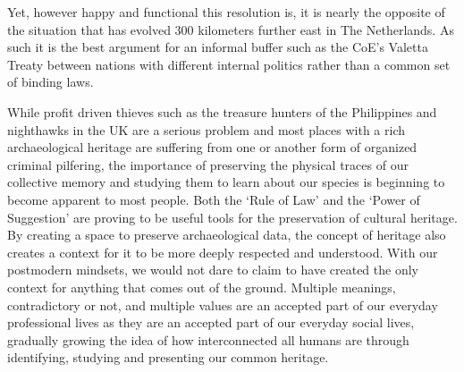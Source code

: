 Yet, however happy and functional this resolution is, it is nearly the opposite of the situation that has evolved 300 kilometers further east in The Netherlands. As such it is the best argument for an informal buffer such as the CoE’s Valetta Treaty between nations with different internal politics rather than a common set of binding laws. 


While profit driven thieves such as the treasure hunters of the Philippines and nighthawks in the UK are a serious problem and most places with a rich archaeological heritage are suffering from one or another form of organized criminal pilfering, the importance of preserving the physical traces of our collective memory and studying them to learn about our species is beginning to become apparent to most people. Both the ‘Rule of Law’ \parencite{RA10066} and the ‘Power of Suggestion’ \parencite{Valetta_1992} are proving to be useful tools for the preservation of cultural heritage. By creating a space to preserve archaeological data, the concept of heritage also creates a context for it to be more deeply respected and understood. With our postmodern mindsets, we would not dare to claim to have created the only context for anything that comes out of the ground. Multiple meanings, contradictory or not, and multiple values are an accepted part of our everyday professional lives as they are an accepted part of our everyday social lives, gradually growing the idea of how interconnected all humans are through identifying, studying and presenting our common heritage.





\IJSRAclosing
%